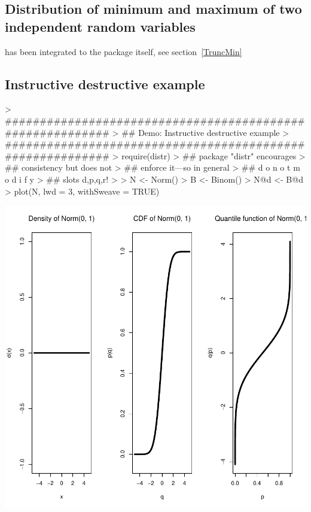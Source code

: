 \documentclass[11pt]{article}
\begin{document}
\subsection{Distribution of minimum and maximum of two independent random variables}\label{minmaxex}
has been integrated to the package itself, see section~\ref{TruncMin}
\subsection{Instructive destructive example}\label{destrex}
\begin{Schunk}
\begin{Sinput}
> ##########################################################
> ## Demo: Instructive destructive example
> ##########################################################
> require(distr)
> ## package "distr" encourages
> ## consistency but does not
> ## enforce it---so in general
> ## d o   n o t   m o d i f y
> ## slots d,p,q,r!
>
> N <- Norm()
> B <- Binom()
> N@d <- B@d
> plot(N, lwd = 3, withSweave = TRUE)
\end{Sinput}
\end{Schunk}
\includegraphics{distr-destructive}
\end{document}
